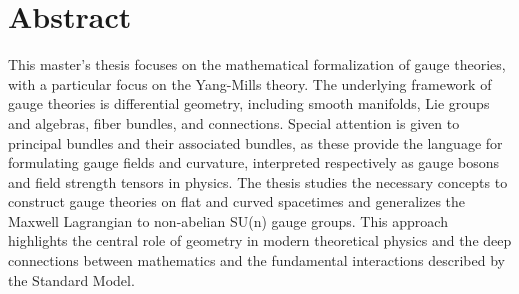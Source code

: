 \documentclass[12pt,a4paper]{report}
\theoremstyle{definition}
\theoremstyle{Theorem}
\theoremstyle{definition}
\theoremstyle{definition}
\begin{document}
	\chapter*{Abstract}
	This master's thesis focuses on the mathematical formalization of gauge theories, with a particular focus on the Yang-Mills theory. %
	The underlying framework of gauge theories is differential geometry, including smooth manifolds, Lie groups and algebras, fiber bundles, and connections. Special attention is given to principal bundles and their associated bundles, as these provide the language for formulating gauge fields and curvature, interpreted respectively as gauge bosons and field strength tensors in physics. The thesis studies the necessary concepts to construct gauge theories on flat and curved spacetimes and generalizes the Maxwell Lagrangian to non-abelian SU(n) gauge groups. This approach highlights the central role of geometry in modern theoretical physics and the deep connections between mathematics and the fundamental interactions described by the Standard Model. 
	\tableofcontents
	\newpage
\end{document}
